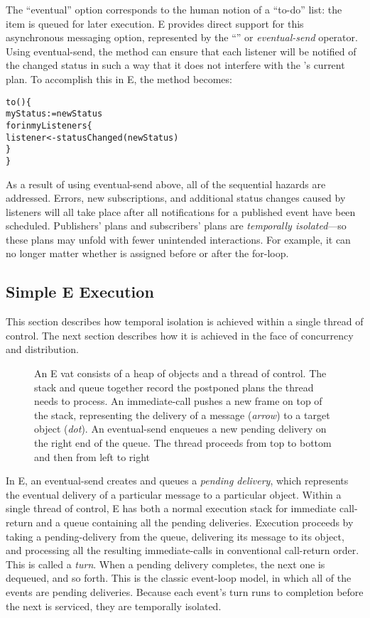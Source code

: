 \documentclass{llncs}
\begin{document}
The ``eventual'' option corresponds to the human notion of a ``to-do''
list: the item is queued for later execution. E provides direct
support for this asynchronous messaging option, represented by the
``\code{<-}'' or \emph{eventual-send} operator. Using eventual-send,
the  method can ensure that each listener will be
notified of the changed status in such a way that it does not
interfere with the 's current plan.  To accomplish
this in E, the  method becomes:
%
\begin{alltt}
    to () \{
        myStatus := newStatus
        for  in myListeners \{
            listener <- statusChanged(newStatus)
        \}
    \}
\end{alltt}
%
As a result of using eventual-send above, all of the sequential
hazards are addressed. Errors, new subscriptions, and additional
status changes caused by listeners will all take place after all
notifications for a published event have been scheduled.  Publishers'
plans and subscribers' plans are \emph{temporally isolated}---so these
plans may unfold with fewer unintended interactions. For example, it
can no longer matter whether  is assigned before or
after the for-loop.

\subsection{Simple E Execution}

This section describes how temporal isolation is achieved within a
single thread of control.  The next section describes how it is
achieved in the face of concurrency and distribution.

\begin{figure}
\centerline{}
\caption{An E vat consists of a heap of objects and a thread of
  control. The stack and queue together record the postponed plans the
  thread needs to process. An immediate-call pushes a new frame on top
  of the stack, representing the delivery of a message ({\it arrow})
  to a target object ({\it dot}). An eventual-send enqueues a new
  pending delivery on the right end of the queue. The thread proceeds
  from top to bottom and then from left to right}
\label{fig:stackvat}
\end{figure}

In E, an eventual-send creates and queues a \emph{pending delivery},
which represents the eventual delivery of a particular message to a
particular object.  Within a single thread of control, E has both a
normal execution stack for immediate call-return and a queue
containing all the pending deliveries.  Execution proceeds by taking a
pending-delivery from the queue, delivering its message to its object,
and processing all the resulting immediate-calls in conventional
call-return order.  This is called a \emph{turn}.  When a pending
delivery completes, the next one is dequeued, and so forth.  This is
the classic event-loop model, in which all of the events are pending
deliveries. Because each event's turn runs to completion before the
next is serviced, they are temporally isolated.
\end{document}
